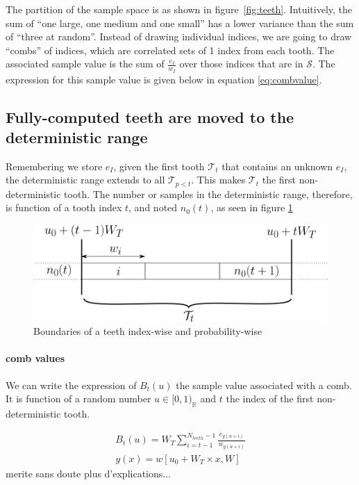 \documentclass[./thesis.tex]{subfiles}
\begin{document}
The partition of the sample space is as shown in figure~\ref{fig:teeth}.
Intuitively, the sum of ``one large, one medium and one small'' has a lower variance than the sum of ``three at random''. Instead of drawing individual indices, we are going to draw ``combs'' of indices, which are correlated sets of 1 index from each tooth. The associated sample value is the sum of $\frac{e_I}{w_I}$ over those indices that are in $\mathcal{S}$.  The expression for this sample value is given below in equation \ref{eq:combvalue}.

\subsection{Fully-computed teeth are moved to the deterministic range}

Remembering we store $e_I$, given the first tooth $\mathcal{T}_t$ that contains an unknown $e_I$, the deterministic range extends to all $\mathcal{T}_{p<t}$. This makes $\mathcal{T}_t$ the first non-deterministic tooth.
The number or samples in the deterministic range, therefore, is function of a tooth index $t$, and noted $n_0(t)$, as seen in figure \ref{fig:boundaries_teeth}

\begin{figure}[h!]
	\begin{center}
		\includegraphics[width=0.9\columnwidth]{figures/pt2/tooththreshold}
	\end{center}
	\caption{Boundaries of a teeth index-wise and probability-wise}
	\label{fig:boundaries_teeth}
\end{figure}


\paragraph{comb values}

We can write the expression of $B_t(u)$ the sample value associated with a comb. It is function of a random number $u \in [0,1)_\mathbb{R}$ and $t$ the index of the first non-deterministic tooth.

\begin{align}
\label{eq:combvalue}
B_t(u) = W_T \sum_{i=t-1}^{N_{teeth}-1} \frac{e_{y(u+i)}}{w_{y(u+i)}} \\
y(x)=w[u_0+ W_T \times x, W]
\end{align}
\alert{merite sans doute plus d'explications...}
\end{document}
